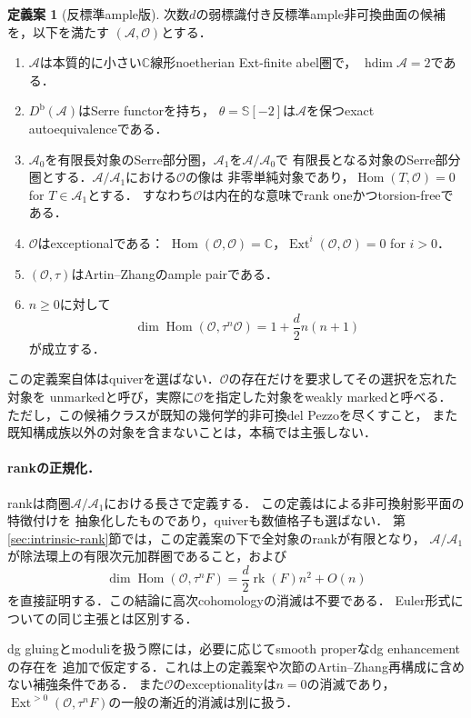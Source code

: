 \documentclass[11pt,a4paper]{ltjsarticle}
\theoremstyle{definition}
\newtheorem{definition}[theorem]{定義案}
\newcommand{\OO}{\mathcal O}
\renewcommand{\AA}{\mathcal A}
\newcommand{\SSer}{\mathbb S}
\newcommand{\Db}{D^{\mathrm b}}
\newcommand{\Hom}{\operatorname{Hom}}
\newcommand{\Ext}{\operatorname{Ext}}
\newcommand{\rk}{\operatorname{rk}}
\begin{document}
\begin{definition}[反標準ample版]\label{def:fano}
次数$d$の弱標識付き反標準ample非可換曲面の候補を，以下を満たす
$(\AA,\OO)$とする．
\begin{enumerate}
\item $\AA$は本質的に小さい$\mathbb C$線形noetherian Ext-finite abel圏で，
$\operatorname{hdim}\AA=2$である．
\item $\Db(\AA)$はSerre functorを持ち，
$\theta=\SSer[-2]$は$\AA$を保つexact autoequivalenceである．
\item $\AA_0$を有限長対象のSerre部分圏，$\AA_1$を$\AA/\AA_0$で
有限長となる対象のSerre部分圏とする．$\AA/\AA_1$における$\OO$の像は
非零単純対象であり，$\Hom(T,\OO)=0$ for $T\in\AA_1$とする．
すなわち$\OO$は内在的な意味でrank oneかつtorsion-freeである．
\item $\OO$はexceptionalである：
$\Hom(\OO,\OO)=\mathbb C$，$\Ext^i(\OO,\OO)=0$ for $i>0$．
\item $(\OO,\tau)$はArtin--Zhangのample pairである．
\item $n\geq0$に対して
\begin{equation}\label{eq:hilbert-dim}
 \dim\Hom(\OO,\tau^n\OO)=1+\frac d2n(n+1)
\end{equation}
が成立する．
\end{enumerate}
\end{definition}

この定義案自体はquiverを選ばない．$\OO$の存在だけを要求してその選択を忘れた対象を
unmarkedと呼び，実際に$\OO$を指定した対象をweakly markedと呼べる．
ただし，この候補クラスが既知の幾何学的非可換del Pezzoを尽くすこと，
また既知構成族以外の対象を含まないことは，本稿では主張しない．

\paragraph{rankの正規化．}
rankは商圏$\AA/\AA_1$における長さで定義する．
この定義は\cite[Proposition A.6]{AOUCompact}による非可換射影平面の特徴付けを
抽象化したものであり，quiverも数値格子も選ばない．
第\ref{sec:intrinsic-rank}節では，この定義案の下で全対象のrankが有限となり，
$\AA/\AA_1$が除法環上の有限次元加群圏であること，および
\[
 \dim\Hom(\OO,\tau^nF)=\frac d2\rk(F)n^2+O(n)
\]
を直接証明する．この結論に高次cohomologyの消滅は不要である．
Euler形式についての同じ主張とは区別する．

dg gluingとmoduliを扱う際には，必要に応じてsmooth properなdg enhancementの存在を
追加で仮定する．これは上の定義案や次節のArtin--Zhang再構成に含めない補強条件である．
また$\OO$のexceptionalityは$n=0$の消滅であり，
$\Ext^{>0}(\OO,\tau^nF)$の一般の漸近的消滅は別に扱う．
\end{document}
